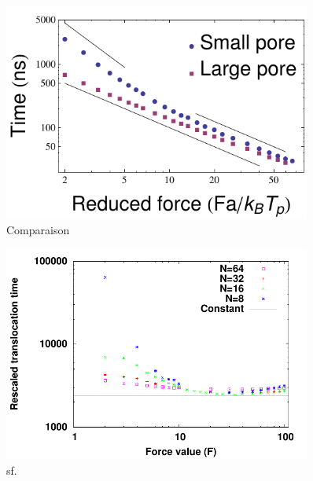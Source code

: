 \documentclass[a4paper,11pt]{article}
\begin{document}
\begin{figure}[H]
\begin{center}
\includegraphics[width=0.9\textwidth]{poresizecomp.pdf} 
\caption{Comparaison}
\label{compporesize}
\end{center}
\end{figure}



\begin{figure}[H]
\begin{center}
\includegraphics[width=0.9\textwidth]{sptransloctaufresc.pdf}
\caption{sf.}
\label{sptransloctaufresc}
\end{center}
\end{figure}
\end{document}
